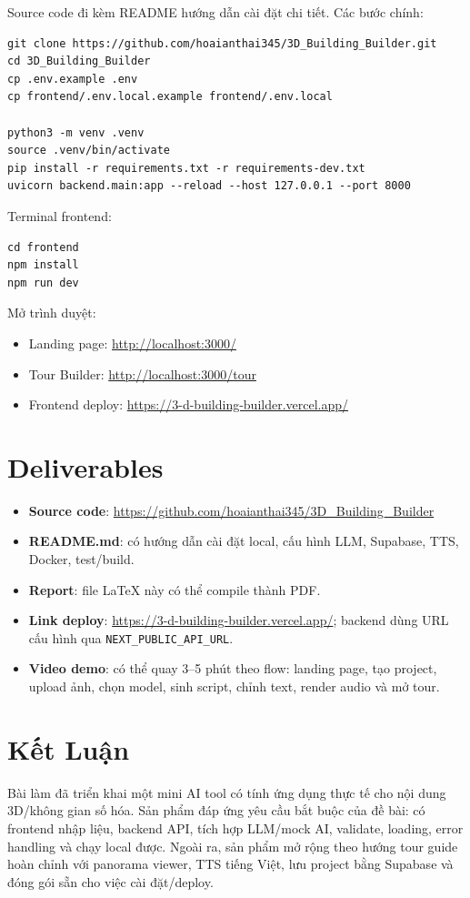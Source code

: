 \documentclass[12pt,a4paper]{article}
\begin{document}
Source code đi kèm README hướng dẫn cài đặt chi tiết. Các bước chính:

\begin{lstlisting}[style=code]
git clone https://github.com/hoaianthai345/3D_Building_Builder.git
cd 3D_Building_Builder
cp .env.example .env
cp frontend/.env.local.example frontend/.env.local

python3 -m venv .venv
source .venv/bin/activate
pip install -r requirements.txt -r requirements-dev.txt
uvicorn backend.main:app --reload --host 127.0.0.1 --port 8000
\end{lstlisting}

Terminal frontend:

\begin{lstlisting}[style=code]
cd frontend
npm install
npm run dev
\end{lstlisting}

Mở trình duyệt:

\begin{itemize}
  \item Landing page: \url{http://localhost:3000/}
  \item Tour Builder: \url{http://localhost:3000/tour}
  \item Frontend deploy: \url{https://3-d-building-builder.vercel.app/}
\end{itemize}

\section{Deliverables}

\begin{itemize}
  \item \textbf{Source code}: \url{https://github.com/hoaianthai345/3D_Building_Builder}
  \item \textbf{README.md}: có hướng dẫn cài đặt local, cấu hình LLM, Supabase, TTS, Docker, test/build.
  \item \textbf{Report}: file LaTeX này có thể compile thành PDF.
  \item \textbf{Link deploy}: \url{https://3-d-building-builder.vercel.app/}; backend dùng URL cấu hình qua \texttt{NEXT\_PUBLIC\_API\_URL}.
  \item \textbf{Video demo}: có thể quay 3--5 phút theo flow: landing page, tạo project, upload ảnh, chọn model, sinh script, chỉnh text, render audio và mở tour.
\end{itemize}

\section{Kết Luận}

Bài làm đã triển khai một mini AI tool có tính ứng dụng thực tế cho nội dung 3D/không gian số hóa. Sản phẩm đáp ứng yêu cầu bắt buộc của đề bài: có frontend nhập liệu, backend API, tích hợp LLM/mock AI, validate, loading, error handling và chạy local được. Ngoài ra, sản phẩm mở rộng theo hướng tour guide hoàn chỉnh với panorama viewer, TTS tiếng Việt, lưu project bằng Supabase và đóng gói sẵn cho việc cài đặt/deploy.
\end{document}
